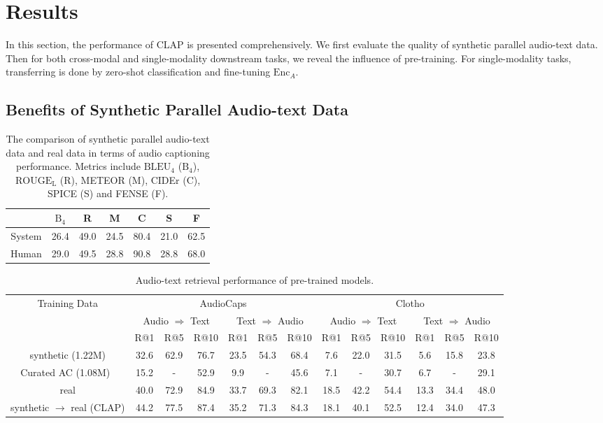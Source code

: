 \documentclass[sigconf,anonymous,review]{acmart}
\begin{document}
\section{Results}
In this section, the performance of CLAP is presented comprehensively.
We first evaluate the quality of synthetic parallel audio-text data.
Then for both cross-modal and single-modality downstream tasks, we reveal the influence of pre-training.
For single-modality tasks, transferring is done by zero-shot classification and fine-tuning $\text{Enc}_A$.

\subsection{Benefits of Synthetic Parallel Audio-text Data}

\begin{table}[ht]
    \begin{tabular}{c|cccccc}
    \toprule
    & $\text{B}_4$ & R & M & C & S & F\\
    \midrule
    System & 26.4 & 49.0 & 24.5 & 80.4 & 21.0 & 62.5\\
    Human & 29.0 & 49.5 & 28.8 & 90.8 & 28.8 & 68.0\\
    \bottomrule
    \end{tabular}
    \label{tab:syn_data_quality}
    \caption{The comparison of synthetic parallel audio-text data and real data in terms of audio captioning performance. Metrics include $\text{BLEU}_4$ ($\text{B}_4$), $\text{ROUGE}_\text{L}$ (R), METEOR (M), CIDEr (C), SPICE (S) and FENSE (F).}
\end{table}

\begin{table}[ht]
    \centering
    \begin{tabular}{c||cccccc||cccccc}
    \toprule
    \multirow{3}{*}{Training Data} & \multicolumn{6}{c||}{AudioCaps} & \multicolumn{6}{c}{Clotho} \\
    \cline{2-13}
     & \multicolumn{3}{c}{Audio $\Rightarrow$ Text} & \multicolumn{3}{c||}{Text $\Rightarrow$ Audio} & \multicolumn{3}{c}{Audio $\Rightarrow$ Text} & \multicolumn{3}{c}{Text $\Rightarrow$ Audio} \\
     & R@1 & R@5 & R@10 & R@1 & R@5 & R@10 & R@1  & R@5 & R@10 & R@1 & R@5 & R@10\\
    \midrule
    synthetic (1.22M) & 32.6 & 62.9 & 76.7 & 23.5 & 54.3 & 68.4 & 7.6 & 22.0
 & 31.5 & 5.6 & 15.8 & 23.8\\
    Curated AC (1.08M)~\cite{zhao2021connecting} & 15.2 & - & 52.9 & 9.9 & - & 45.6 & 7.1 & - & 30.7 & 6.7 & - & 29.1\\
    \midrule
    real & 40.0 & 72.9 & 84.9 & 33.7 & 69.3 & 82.1 & 18.5 & 42.2 & 54.4 & 13.3 & 34.4 & 48.0\\
    synthetic $\rightarrow$ real (CLAP) & 44.2 & 77.5 & 87.4 & 35.2 & 71.3 & 84.3 & 18.1 & 40.1 & 52.5 & 12.4 & 34.0 & 47.3\\
    \bottomrule
    \end{tabular}
     \caption{Audio-text retrieval performance of pre-trained models.}
    \label{tab:pre_train_effects}
\end{table}
\end{document}
